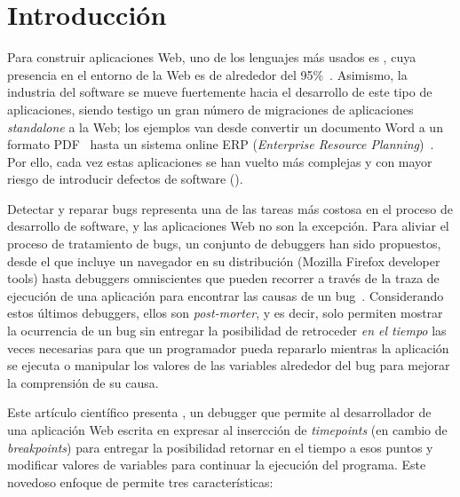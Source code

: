 \documentclass[conference]{IEEEtran}
\begin{document}
\section{Introducci\'on}
\label{sec:intro}

Para construir aplicaciones Web, uno de los lenguajes m\'as usados es \javascript, cuya presencia en el entorno de la Web es de alrededor del 95\%~\cite{jsuses}. Asimismo, la industria del software se mueve fuertemente hacia el desarrollo de este tipo de aplicaciones, siendo testigo un gran n\'umero de migraciones de aplicaciones {\em standalone} a la Web; los ejemplos van desde convertir un documento Word a un formato PDF~\cite{smallpdf} hasta un sistema online ERP ({\em Enterprise Resource Planning})~\cite{erpOrcale}. Por ello, cada vez estas aplicaciones se han vuelto m\'as complejas y con mayor riesgo de introducir defectos de software (). 

Detectar y reparar bugs representa una de las tareas m\'as costosa en el proceso de desarrollo de software, y las aplicaciones Web no son la excepci\'on. Para aliviar el proceso de tratamiento de bugs, un conjunto de debuggers han sido propuestos, desde el que incluye un navegador en su distribuci\'on (\eg Mozilla Firefox developer tools) hasta  debuggers omniscientes que pueden recorrer a trav\'es de la traza de ejecuci\'on de una aplicaci\'on para encontrar las causas de un bug~\cite{azar:2016,barrAl:fse2016}. Considerando estos \'ultimos debuggers, ellos son {\em post-morter}, y es decir, solo permiten mostrar la ocurrencia de un bug sin entregar la posibilidad de retroceder {\em en el tiempo} las veces necesarias para que un programador pueda repararlo mientras la aplicaci\'on se ejecuta o manipular los valores de las variables alrededor del bug para mejorar la comprensi\'on de su causa.       

Este art\'iculo cient\'ifico presenta \deloreanjs, un debugger que permite al desarrollador de una aplicaci\'on Web escrita en \javascript expresar al insercci\'on de {\em timepoints} (en cambio de {\em breakpoints}) para entregar la posibilidad retornar en el tiempo a esos puntos y modificar valores de variables para continuar la ejecuci\'on del programa. Este novedoso enfoque de \deloreanjs permite tres caracter\'isticas:    
\end{document}
